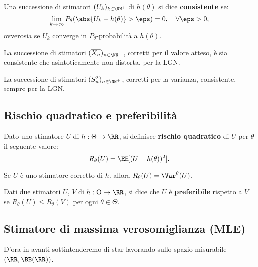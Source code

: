 \begin{multicols*}{2}
\begin{definition}
    Una successione di stimatori $(U_k)_{k \in \NN^+}$ di $h(\theta)$ si dice
    \textbf{consistente} se:
    \[
        \lim_{k \to \infty} P_\theta(\abs{U_k - h(\theta)} > \eps) = 0, \quad \forall \eps > 0,
    \]
    ovverosia se $U_k$ converge in $P_\theta$-probabilità a $h(\theta)$.
\end{definition}

\begin{remark}
    La successione di stimatori $(\overline{X_n})_{n \in \NN^+}$, corretti per
    il valore atteso, è sia consistente che
    asintoticamente non distorta, per la LGN.
\end{remark}

\begin{remark}
    La successione di stimatori $(S^2_n)_{n \in \NN^+}$, corretti per la
    varianza, consistente, sempre per la LGN.
\end{remark}

\subsection{Rischio quadratico e preferibilità}

\begin{definition}
    Dato uno stimatore $U$ di $h : \Theta \to \RR$, si definisce
    \textbf{rischio quadratico} di $U$ per $\theta$ il seguente valore:
    \[
        R_\theta(U) = \EE[(U - h(\theta))^2].
    \]
\end{definition}

\begin{remark}
    Se $U$ è uno stimatore corretto di $h$, allora
    $R_\theta(U) = \Var^\theta(U)$.
\end{remark}

\begin{definition}[Preferibilità]
    Dati due stimatori $U$, $V$ di $h : \Theta \to \RR$, si dice
    che $U$ è \textbf{preferibile} rispetto a $V$ se
    $R_\theta(U) \leq R_\theta(V)$ per ogni $\theta \in \Theta$.
\end{definition}

\subsection{Stimatore di massima verosomiglianza (MLE)}

D'ora in avanti sottintenderemo di star lavorando sullo
spazio misurabile $(\RR, \BB(\RR))$.


\end{multicols*}
